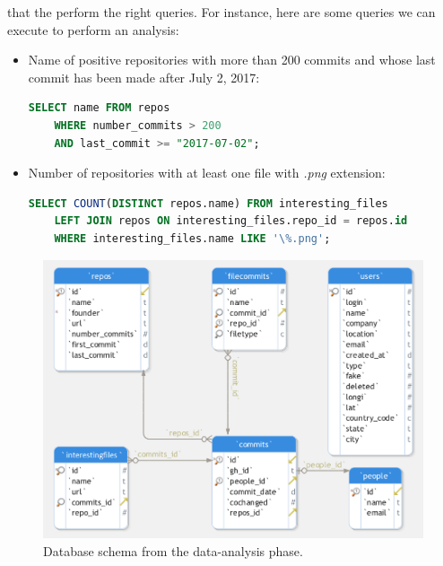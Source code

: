 \documentclass[a4paper, 12pt]{book}
\begin{document}
that the perform the right queries. For instance, here are some queries we can execute to perform an analysis:
\begin{itemize}
    \item Name of positive repositories with more than 200 commits and whose last commit has been made after July 2, 2017:
    \begin{lstlisting}[language=SQL]
    SELECT name FROM repos
    WHERE number_commits > 200
    AND last_commit >= "2017-07-02"; \end{lstlisting}
    \item Number of repositories with at least one file with \textit{.png} extension:
    \begin{lstlisting}[language=SQL]
    SELECT COUNT(DISTINCT repos.name) FROM interesting_files
    LEFT JOIN repos ON interesting_files.repo_id = repos.id
    WHERE interesting_files.name LIKE '\%.png'; \end{lstlisting}
\end{itemize}

\begin{figure}
  \centering
  \includegraphics[width=15cm, keepaspectratio]{img/dbschema-generic}
  \caption{Database schema from the data-analysis phase.}
  \label{fig:dbschema}
\end{figure}
\cleardoublepage
\end{document}
